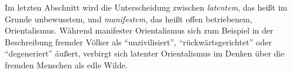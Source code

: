 \documentclass[a4paper, 12pt]{article}
\begin{document}
\begin{onehalfspace}
Im letzten Abschnitt wird die Unterscheidung zwischen \emph{latentem}, das heißt im Grunde unbewusstem, und \emph{manifestem}, das heißt offen betriebenem, Orientalismus. Während manifester Orientalismus sich zum Beispiel in der Beschreibung fremder Völker als "`unzivilisiert"', "`rückwärtsgerichtet"' oder "`degeneriert"' äußert, verbirgt sich latenter Orientalismus im Denken über die fremden Menschen als edle Wilde.



\end{onehalfspace}
\nocite{*}
%
\printbibliography
\end{document}
